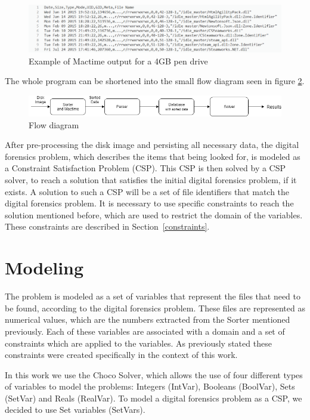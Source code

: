 \begin{figure}
    \centering
    \includegraphics[width=120mm]{mactimeOut.png}
    \caption{Example of Mactime output for a 4GB pen drive}
    \label{fig:mactimeOut}
\end{figure}

The whole program can be shortened into the small flow diagram seen in figure \ref{fig:diagram}.

\begin{figure}
    \centering
    \includegraphics[width=120mm]{diagram.png}
    \caption{Flow diagram}
    \label{fig:diagram}
\end{figure}

After pre-processing the disk image and persisting all necessary data, the digital forensics problem, which describes the items that being looked for, is modeled as a Constraint Satisfaction Problem (CSP). This CSP is then solved by a CSP solver, to reach a solution that satisfies the initial digital forensics problem, if it exists. A solution to such a CSP will be a set of file identifiers that match the digital forensics problem. It is necessary to use specific constraints to reach the solution mentioned before, which are used to restrict the domain of the variables. These constraints are described in Section~\ref{constraints}.

\section{Modeling}

The problem is modeled as a set of variables that represent the files that need to be found, according to the digital forensics problem. These files are represented as numerical values, which are the \INODE numbers extracted from the Sorter mentioned previously. Each of these variables are associated with a domain and a set of constraints which are applied to the variables. As previously stated these constraints were created specifically in the context of this work.

In this work we use the Choco Solver, which allows the use of four different types of variables to model the problems: Integers (IntVar), Booleans (BoolVar), Sets (SetVar) and Reals (RealVar). To model a digital forensics problem as a CSP, we decided to use  Set variables (SetVars).

